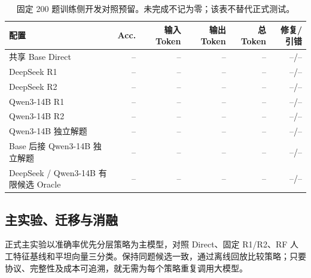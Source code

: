 \documentclass[11pt]{article}
\begin{document}
\begin{table}[t]
\centering\small
\caption{固定 200 题训练侧开发对照预留。未完成不记为零；该表不替代正式测试。}
\label{tab:pilot}
\begin{tabular}{lrrrrr}
\toprule
配置 & Acc. & 输入 Token & 输出 Token & 总 Token & 修复/引错\\
\midrule
共享 Base Direct & -- & -- & -- & -- & --/--\\
DeepSeek R1 & -- & -- & -- & -- & --/--\\
DeepSeek R2 & -- & -- & -- & -- & --/--\\
Qwen3-14B R1 & -- & -- & -- & -- & --/--\\
Qwen3-14B R2 & -- & -- & -- & -- & --/--\\
Qwen3-14B 独立解题 & -- & -- & -- & -- & --/--\\
Base 后接 Qwen3-14B 独立解题 & -- & -- & -- & -- & --/--\\
DeepSeek / Qwen3-14B 有限候选 Oracle & -- & -- & -- & -- & --/--\\
\bottomrule
\end{tabular}
\end{table}

\subsection{主实验、迁移与消融}
正式主实验以准确率优先分层策略为主模型，对照 Direct、固定 R1/R2、RF 人工特征基线和平坦向量三分类。保持同题候选一致，通过离线回放比较策略；只要协议、完整性及成本可追溯，就无需为每个策略重复调用大模型。

\begin{table}[t]
\centering\small
\caption{完整输出条件下 GSM8K 1319 题主实验预留，尚未完成。}
\label{tab:main-pending}
\end{table}
\end{document}
